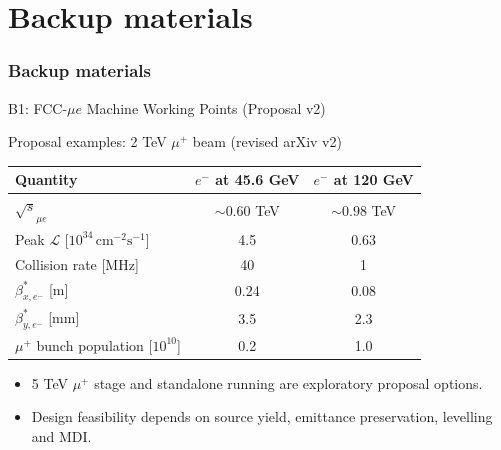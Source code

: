 \documentclass[aspectratio=1610,english]{beamer}
\newcommand{\src}[1]{\vfill{\par\color{black!65}\fontsize{6.4}{7.4}\selectfont\emph{Source:} #1\par}}
\begin{document}








\appendix

\part{Backup materials}
\section{Backup materials}




\begin{frame}[t]{B1: FCC-$\mu e$ Machine Working Points (Proposal v2)}
\small

\begin{block}{Proposal examples: 2 TeV $\mu^+$ beam (revised arXiv v2)}
\begin{center}\setlength{\tabcolsep}{6pt}
\begin{tabular}{lcc}\toprule
Quantity & $e^-$ at 45.6 GeV & $e^-$ at 120 GeV\\\midrule
$\sqrt{s}_{\mu e}$ & $\sim0.60$ TeV & $\sim0.98$ TeV\\
Peak $\mathcal L$ [$10^{34}\,\mathrm{cm}^{-2}\mathrm{s}^{-1}$] & 4.5 & 0.63\\
Collision rate [MHz] & 40 & 1\\
$\beta^*_{x,e^-}$ [m] & 0.24 & 0.08\\
$\beta^*_{y,e^-}$ [mm] & 3.5 & 2.3\\
$\mu^+$ bunch population [$10^{10}$] & 0.2 & 1.0\\\bottomrule
\end{tabular}\end{center}
\end{block}
\begin{itemize}\item 5 TeV $\mu^+$ stage and standalone running are exploratory proposal options.
\item Design feasibility depends on source yield, emittance preservation, levelling and MDI.
\end{itemize}

\end{frame}
\end{document}
